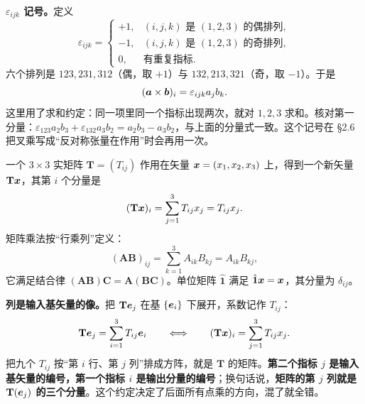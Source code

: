 \documentclass[11pt]{ctexart}
\newcommand{\ten}[1]{\mathbf{#1}}
\newcommand{\unitd}{\hat{\ten{1}}}
\let\origsubhdr\subhdr
\renewcommand{\subhdr}[1]{\par\needspace{3\baselineskip}\origsubhdr{#1}}
\begin{document}
\textbf{$\varepsilon_{ijk}$ 记号。}定义
\[
\varepsilon_{ijk}=
\begin{cases}
+1,&(i,j,k)\text{ 是 }(1,2,3)\text{ 的偶排列},\\
-1,&(i,j,k)\text{ 是 }(1,2,3)\text{ 的奇排列},\\
0,&\text{有重复指标}.
\end{cases}
\]
六个排列是 $123,231,312$（偶，取 $+1$）与 $132,213,321$（奇，取 $-1$）。于是
\[
(\boldsymbol{a}\times\boldsymbol{b})_i=\varepsilon_{ijk}a_jb_k .
\]
这里用了求和约定：同一项里同一个指标出现两次，就对 $1,2,3$ 求和。核对第一分量：$\varepsilon_{123}a_2b_3+\varepsilon_{132}a_3b_2=a_2b_3-a_3b_2$，与上面的分量式一致。这个记号在 \S2.6 把叉乘写成“反对称张量在作用”时会再用一次。

\label{subsec:matrix}

一个 $3\times3$ 实矩阵 $\ten T=(T_{ij})$ 作用在矢量 $\boldsymbol{x}=(x_1,x_2,x_3)$ 上，得到一个新矢量 $\ten T\vect x$，其第 $i$ 个分量是
\[
(\ten T\vect x)_i=\sum_{j=1}^{3}T_{ij}x_j=T_{ij}x_j .
\]
矩阵乘法按“行乘列”定义：
\[
(\ten A\ten B)_{ij}=\sum_{k=1}^{3}A_{ik}B_{kj}=A_{ik}B_{kj},
\]
它满足结合律 $(\ten A\ten B)\ten C=\ten A(\ten B\ten C)$。单位矩阵 $\unitd$ 满足 $\unitd\vect x=\vect x$，其分量为 $\delta_{ij}$。

\textbf{列是输入基矢量的像。}把 $\ten T\vect e_j$ 在基 $\{\boldsymbol{e}_i\}$ 下展开，系数记作 $T_{ij}$：
\[
\ten T\vect e_j=\sum_{i=1}^{3}T_{ij}\vect e_i
\qquad\Longleftrightarrow\qquad
(\ten T\vect x)_i=\sum_{j=1}^{3}T_{ij}x_j .
\]
把九个 $T_{ij}$ 按“第 $i$ 行、第 $j$ 列”排成方阵，就是 $\ten T$ 的矩阵。\textbf{第二个指标 $j$ 是输入基矢量的编号，第一个指标 $i$ 是输出分量的编号}；换句话说，\textbf{矩阵的第 $j$ 列就是 $\ten T(\vect e_j)$ 的三个分量}。这个约定决定了后面所有点乘的方向，混了就全错。
\end{document}
